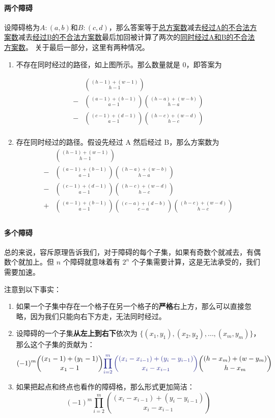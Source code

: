 \paragraph{两个障碍}设障碍格为$A:(a,b)$和$B:(c,d)$，那么答案等于\uline{总方案数}减去{\uline{经过A的不合法方案数}}减去\uline{经过B的不合法方案数}最后加回被计算了两次的\uline{同时经过A和B的不合法方案数}。 关于最后一部分，这里有两种情况。
\begin{enumerate}
\item 不存在同时经过的路径，如上图所示。那么数量就是 $0$，即答案为 


\begin{align*}
& \binom{(h-1)+(w-1)}{h-1} \\
-& \binom{(a-1)+(b-1)}{a-1}\binom{(h-a)+(w-b)}{h-a}\\
-& \binom{(c-1)+(d-1)}{a-1}\binom{(h-c)+(w-d)}{h-c}\\
\end{align*}

\item 存在同时经过的路径。假设先经过 A 然后经过 B，那么方案数为 
\begin{align*}
& \binom{(h-1)+(w-1)}{h-1} \\
-& \binom{(a-1)+(b-1)}{a-1}\binom{(h-a)+(w-b)}{h-a}\\
-& \binom{(c-1)+(d-1)}{a-1}\binom{(h-c)+(w-d)}{h-c}\\
+& \binom{(a-1)+(b-1)}{a-1}\binom{(c-a)+(d-b)}{c-a}\binom{(h-c)+(w-d)}{h-c}\\
\end{align*}
\end{enumerate}
\paragraph{多个障碍} 总的来说，容斥原理告诉我们，对于障碍的每个子集，如果有奇数个就减去，有偶数个就加上。但 $n$ 个障碍就意味着有 $2^n$ 个子集需要计算，这是无法承受的，我们需要加速。

注意到以下事实：
\begin{enumerate}
\item 如果一个子集中存在一个格子在另一个格子的\textbf{严格}右上方，那么可以直接忽略，因为我们只能向右下方走，无法同时经过。
\item 设障碍的一个子集\textbf{从左上到右下}依次为 $\{(x_1,y_1),(x_2,y_2),\dots,(x_m,y_m) \}$，那么这个子集的贡献为：
$$
(-1)^m\binom{(x_1-1)+(y_1-1)}{x_1-1}
{
\color{Blue}
{
\prod_{i=2}^m \binom{(x_i-x_{i-1})+(y_i-y_{i-1})}{x_i-x_{i-1}}
}
}
\binom{(h-x_m)+(w-y_m)}{h-x_m}
$$
\item 如果把起点和终点也看作的障碍格，那么形式更加简洁： 
$$
(-1)^m\prod_{i=2}^m \binom{(x_i-x_{i-1})+(y_i-y_{i-1})}{x_i-x_{i-1}} 
$$
\end{enumerate}

